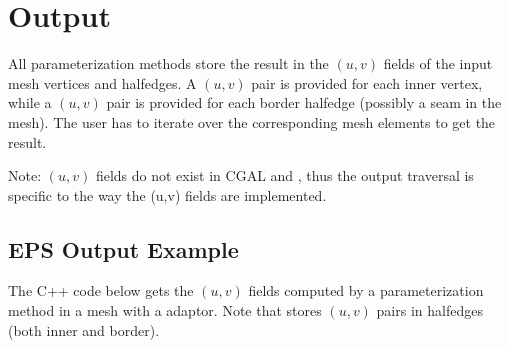 \section{Output}

All parameterization methods store the result in the $(u,v)$ fields of
the input mesh vertices and halfedges. A $(u,v)$ pair is provided for
each inner vertex, while a $(u,v)$ pair is provided for each border
halfedge (possibly a seam in the mesh). The user has to iterate over
the corresponding mesh elements to get the result.

Note: $(u,v)$ fields do not exist in CGAL  and
, thus the output traversal is specific to the way the (u,v) fields are implemented.

\subsection{EPS Output Example}

The C++ code below gets the $(u,v)$ fields computed by a
parameterization method in a  mesh with a
 adaptor.  Note that
 stores $(u,v)$ pairs in
halfedges (both inner and border).

